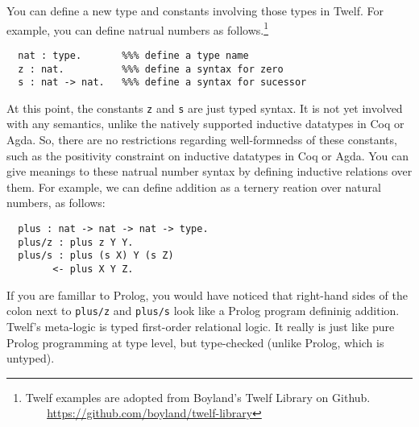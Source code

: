 You can define a new type and constants involving those types in Twelf.
For example, you can define natrual numbers as follows.\footnote{
	Twelf examples are adopted from Boyland's Twelf Library on Github.\\
	$~~~~~~~$
	\url{https://github.com/boyland/twelf-library}}\vspace*{-2em}
\begin{singlespace}
\begin{verbatim}
  nat : type.       %%% define a type name
  z : nat.          %%% define a syntax for zero
  s : nat -> nat.   %%% define a syntax for sucessor
\end{verbatim}
\end{singlespace}\noindent
At this point, the constants \texttt{z} and \texttt{s} are just typed syntax.
It is not yet involved with any semantics, unlike the natively supported
inductive datatypes in Coq or Agda. So, there are no restrictions regarding
well-formnedss of these constants, such as the positivity constraint on
inductive datatypes in Coq or Agda.
You can give meanings to these natrual number syntax by defining
inductive relations over them. For example, we can define addition
as a ternery reation over natural numbers, as follows:\vspace*{-2em}
\begin{singlespace}
\begin{verbatim}
  plus : nat -> nat -> nat -> type.
  plus/z : plus z Y Y.
  plus/s : plus (s X) Y (s Z)
        <- plus X Y Z.
\end{verbatim}
\end{singlespace}\noindent
If you are famillar to Prolog, you would have noticed that
right-hand sides of the colon next to \verb|plus/z| and \verb|plus/s|
look like a Prolog program defininig addition. Twelf's meta-logic
is typed first-order relational logic.  It really is just
like pure Prolog programming at type level, but type-checked
(unlike Prolog, which is untyped).

